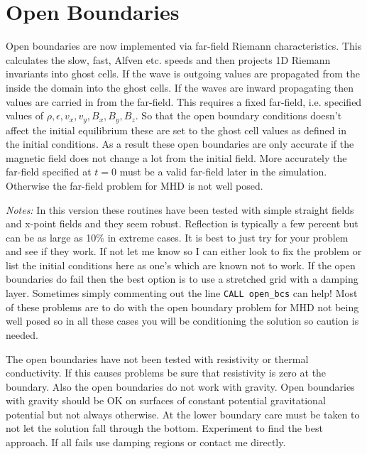 \documentclass[11pt]{article}
\begin{document}

\section{Open  Boundaries} %
\label{sec:open_bcs}
Open boundaries are now implemented via far-field Riemann characteristics. This calculates the slow, fast, Alfven etc. speeds and then projects 1D Riemann invariants into ghost cells. If the wave is outgoing values are propagated from the inside the domain into the ghost cells. If the waves are inward propagating then values are carried in from the far-field. This requires a fixed far-field, i.e. specified values of $\rho, \epsilon, v_x, v_y, B_x, B_y, B_z$. So that the open boundary conditions doesn't affect the initial equilibrium these are set to the ghost cell values as defined in the initial conditions. As a result these open boundaries are only accurate if the magnetic field does not change a lot from the initial field. More accurately the far-field specified at $t=0$ must be a valid far-field later in the simulation. Otherwise the far-field problem for MHD is not well posed.

{\it Notes:} In this version these routines have been tested with simple straight fields and x-point fields and they seem robust. Reflection is typically a few percent but can be as large as 10\% in extreme cases. It is best to just try for your problem and see if they work. If not let me know so I can either look to fix the problem or list the initial conditions here as one's which are known not to work. If the open boundaries do fail then the best option is to use a stretched grid with a damping layer. Sometimes simply commenting out the line {\tt CALL open\_bcs} can help! Most of these problems are to do with the open boundary problem for MHD not being well posed so in all these cases you will be conditioning the solution so caution is needed.

The open boundaries have not been tested with resistivity or thermal conductivity. If this causes problems be sure that resistivity is zero at the boundary. Also the open boundaries do not work with gravity. Open boundaries with gravity should be OK on surfaces of constant potential gravitational potential but not always otherwise. At the lower boundary care must be taken to not let the solution fall through the bottom. Experiment to find the best approach. If all fails use damping regions or contact me directly.

\end{document}
